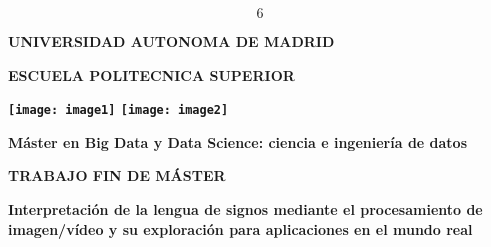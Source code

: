 \documentclass{article} %
\begin{document}


\noindent 

\noindent 

\noindent 

\noindent 

\noindent 

\noindent 
\[6\] 

{\bf }

\noindent 
{\bf }

\noindent 
{\bf }

\noindent 

\noindent 

\noindent 

\noindent 

\noindent \textbf{UNIVERSIDAD AUTONOMA DE MADRID}

\noindent 

\noindent \textbf{ESCUELA POLITECNICA SUPERIOR}

\noindent \textbf{}

\noindent \textbf{}

\noindent \textbf{}

\noindent \textbf{\texttt{[image: image1]}        \texttt{[image: image2]}       }

\noindent \textbf{}

\noindent \textbf{}

\noindent \textbf{}

\noindent \textbf{}

\noindent \textbf{M\'{a}ster en Big Data y Data Science: ciencia e ingenier\'{i}a de datos}

\noindent \textbf{}

\noindent \textbf{TRABAJO FIN DE M\'{A}STER}

\noindent 

\noindent 

\noindent 

\noindent 

\noindent \textbf{Interpretaci\'{o}n de la lengua de signos mediante el procesamiento de imagen/v\'{i}deo y su exploraci\'{o}n para aplicaciones en el mundo real}

\noindent 

\noindent 

\noindent \textbf{}

\noindent \textbf{}

\noindent \textbf{}
\end{document}
